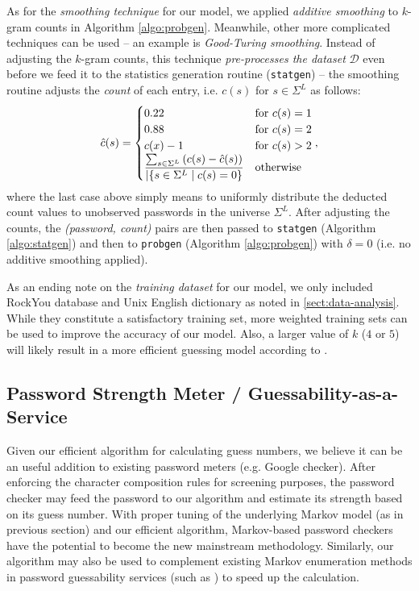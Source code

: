 \documentclass{article} %
\theoremstyle{definition}
\theoremstyle{theorem}
\theoremstyle{remark}
\theoremstyle{remark}
\begin{document}
\par\quad As for the \emph{smoothing technique} for our model, we applied \emph{additive smoothing} to $k$-gram counts in Algorithm \ref{algo:probgen}. Meanwhile, other more complicated techniques can be used -- an example is \emph{Good-Turing smoothing}. Instead of adjusting the $k$-gram counts, this technique \emph{pre-processes the dataset} $\mathcal{D}$ even before we feed it to the statistics generation routine (\texttt{statgen}) -- the smoothing routine adjusts the \emph{count} of each entry, i.e. $c(s)$ for $s\in\Sigma^L$ as follows:
\vspace{-5pt}
$$\hat{c}(s) = \begin{cases}
             0.22       & \text{for } c(s) = 1  \\
             0.88       & \text{for } c(s) = 2  \\
             c(x) - 1   & \text{for } c(s) > 2  \\
             \dfrac{\sum_{s\in\Sigma^L}{(c(s) - \hat{c}(s))}}{|\{s\in\Sigma^L \mid {c(s)=0}\}}  & \text{otherwise}
         \end{cases},\vspace{-1pt}
$$
where the last case above simply means to uniformly distribute the deducted count values to unobserved passwords in the universe $\Sigma^L$. After adjusting the counts, the \emph{(password, count)} pairs are then passed to \texttt{statgen} (Algorithm \ref{algo:statgen}) and then to \texttt{probgen} (Algorithm \ref{algo:probgen}) with $\delta = 0$ (i.e. no additive smoothing applied).

\par\quad As an ending note on the \emph{training dataset} for our model, we only included RockYou database and Unix English dictionary as noted in \ref{sect:data-analysis}. While they constitute a satisfactory training set, more weighted training sets can be used to improve the accuracy of our model. Also, a larger value of $k$ ($4$ or $5$) will likely result in a more efficient guessing model according to \cite{probabilistic}.

\subsection{Password Strength Meter / Guessability-as-a-Service}
\par\quad Given our efficient algorithm for calculating guess numbers, we believe it can be an useful addition to existing password meters (e.g. Google checker). After enforcing the character composition rules for screening purposes, the password checker may feed the password to our algorithm and estimate its strength based on its guess number. With proper tuning of the underlying Markov model (as in previous section) and our efficient algorithm, Markov-based password checkers have the potential to become the new mainstream methodology. Similarly, our algorithm may also be used to complement existing Markov enumeration methods in password guessability services (such as \cite{cmu-guessability}) to speed up the calculation.
\end{document}
